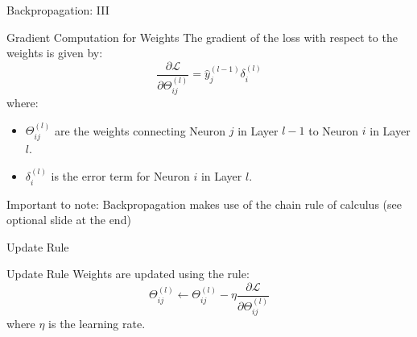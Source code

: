 \documentclass[aspectratio=169]{../latex_main/tntbeamer}  %
\begin{document}
        \begin{frame}{Backpropagation: III}

        \vspace{-2em}
        \begin{block}{Gradient Computation for Weights}
        The gradient of the loss with respect to the weights is given by:
        \[
        \frac{\partial \mathcal{L}}{\partial \Theta_{ij}^{(l)}} = \hat{y}_j^{(l-1)} \delta_i^{(l)}
        \]
        where:
        \begin{itemize}
            \item \( \Theta_{ij}^{(l)} \) are the weights connecting Neuron \( j \) in Layer \( l-1 \) to Neuron \( i \) in Layer \( l \).
            \item \( \delta_i^{(l)} \) is the error term for Neuron \( i \) in Layer \( l \).
        \end{itemize}
        \end{block}

        Important to note: Backpropagation makes use of the chain rule of calculus (see optional slide at the end)
        
        \end{frame}
        \begin{frame}{Update Rule}

        \begin{block}{Update Rule}
            Weights are updated using the rule:
            \[
            \Theta_{ij}^{(l)} \leftarrow \Theta_{ij}^{(l)} - \eta \frac{\partial \mathcal{L}}{\partial \Theta_{ij}^{(l)}}
            \]
            where \( \eta \) is the learning rate.
         \end{block}
            
        \end{frame}
\end{document}
